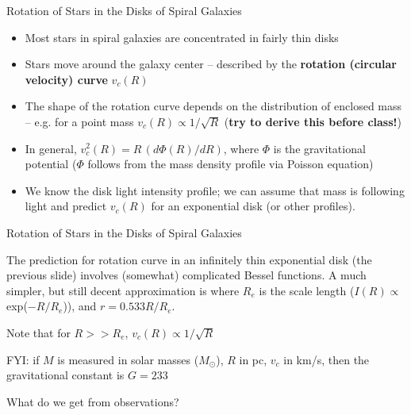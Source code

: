 \documentclass[letterpaper,landscape]{slides}
\begin{document}

\begin{slide}
\begin{center}
{\large \color{red} 
             Rotation of Stars in the Disks of Spiral Galaxies }
\end{center}

\begin{itemize}
\item Most stars in spiral galaxies are concentrated in fairly thin disks
\item Stars move around the galaxy center -- described by the {\bf rotation (circular
     velocity) curve} $v_c(R)$
\item The shape of the rotation curve depends on the distribution of enclosed
      mass -- e.g. for a point mass $v_c(R) \propto 1/\sqrt{R}$ ({\bf try to derive this
      before class!})
\item In general, $v^2_c(R) = R \, (d\Phi(R)/dR)$, where $\Phi$ is the gravitational
      potential ($\Phi$ follows from the mass density profile via Poisson 
      equation)
\item We know the disk light intensity profile; we can assume that mass is 
      following light and predict $v_c(R)$ for an exponential disk (or other profiles).
\end{itemize}     
 
\vfill
\end{slide}





\begin{slide}
\begin{center}
{\large \color{red} 
             Rotation of Stars in the Disks of Spiral Galaxies }
\end{center}


The prediction for rotation curve in an infinitely thin 
exponential disk (the previous slide) involves (somewhat)
complicated Bessel functions. A much simpler, but still
decent approximation is 
where $R_e$ is the scale length ($I(R) \propto$ exp($-R/R_e$)), and
$r = 0.533 R/R_e$. 

Note that for $R >> R_e$, $v_c(R) \propto 1/\sqrt{R}$

FYI: if $M$ is measured in solar masses ($M_\odot$), $R$ in pc, 
$v_c$ in km/s, then the gravitational constant is $G=233$

{\color{blue} What do we get from observations?}

\vfill
\end{slide}
\end{document}
